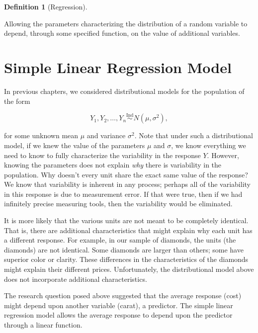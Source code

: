 \documentclass[
  letterpaper,
  DIV=11,
  numbers=noendperiod]{scrreprt}
\theoremstyle{definition}
\newtheorem{definition}{Definition}[chapter]
\theoremstyle{definition}
\theoremstyle{plain}
\theoremstyle{remark}
\begin{document}
\begin{definition}[Regression]\protect\hypertarget{def-regression}{}\label{def-regression}

Allowing the parameters characterizing the distribution of a random
variable to depend, through some specified function, on the value of
additional variables.

\end{definition}

\hypertarget{simple-linear-regression-model}{%
\section{Simple Linear Regression
Model}\label{simple-linear-regression-model}}

In previous chapters, we considered distributional models for the
population of the form

\[Y_1, Y_2, \dotsc, Y_n \stackrel{\text{Ind}}{\sim} N\left(\mu, \sigma^2\right),\]

for some unknown mean \(\mu\) and variance \(\sigma^2\). Note that under
such a distributional model, if we knew the value of the parameters
\(\mu\) and \(\sigma\), we know everything we need to know to fully
characterize the variability in the response \(Y\). However, knowing the
parameters does not explain \emph{why} there is variability in the
population. Why doesn't every unit share the exact same value of the
response? We know that variability is inherent in any process; perhaps
all of the variability in this response is due to measurement error. If
that were true, then if we had infinitely precise measuring tools, then
the variability would be eliminated.

It is more likely that the various units are not meant to be completely
identical. That is, there are additional characteristics that might
explain why each unit has a different response. For example, in our
sample of diamonds, the units (the diamonds) are not identical. Some
diamonds are larger than others; some have superior color or clarity.
These differences in the characteristics of the diamonds might explain
their different prices. Unfortunately, the distributional model above
does not incorporate additional characteristics.

The research question posed above suggested that the average response
(cost) might depend upon another variable (carat), a predictor. The
simple linear regression model allows the average response to depend
upon the predictor through a linear function.
\end{document}
